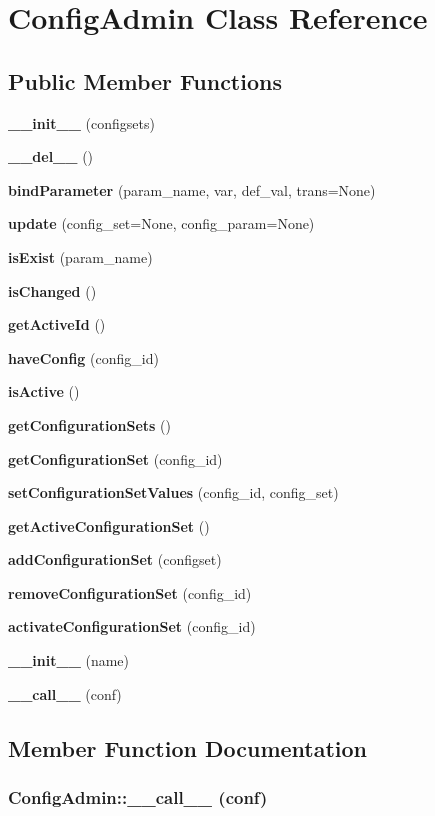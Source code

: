 \section{Config\-Admin Class Reference}
\label{classConfigAdmin}
\subsection*{Public Member Functions}
\begin{CompactItemize}
\item 
{\bf \_\-\_\-init\_\-\_\-} (configsets)
\item 
{\bf \_\-\_\-del\_\-\_\-} ()
\item 
{\bf bind\-Parameter} (param\_\-name, var, def\_\-val, trans=None)
\item 
{\bf update} (config\_\-set=None, config\_\-param=None)
\item 
{\bf is\-Exist} (param\_\-name)
\item 
{\bf is\-Changed} ()
\item 
{\bf get\-Active\-Id} ()
\item 
{\bf have\-Config} (config\_\-id)
\item 
{\bf is\-Active} ()
\item 
{\bf get\-Configuration\-Sets} ()
\item 
{\bf get\-Configuration\-Set} (config\_\-id)
\item 
{\bf set\-Configuration\-Set\-Values} (config\_\-id, config\_\-set)
\item 
{\bf get\-Active\-Configuration\-Set} ()
\item 
{\bf add\-Configuration\-Set} (configset)
\item 
{\bf remove\-Configuration\-Set} (config\_\-id)
\item 
{\bf activate\-Configuration\-Set} (config\_\-id)
\item 
{\bf \_\-\_\-init\_\-\_\-} (name)
\item 
{\bf \_\-\_\-call\_\-\_\-} (conf)
\end{CompactItemize}


\subsection{Member Function Documentation}
\subsubsection{\setlength{\rightskip}{0pt plus 5cm}Config\-Admin::\_\-\_\-call\_\-\_\- (conf)}\label{classConfigAdmin_ConfigAdmina17}


